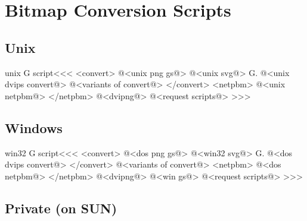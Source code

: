 \documentclass{article}
\begin{document}
\section{Bitmap Conversion Scripts}



\subsection{Unix}




\<unix G script\><<<
 <convert>
@<unix png gs@>
@<unix svg@>
G.
@<unix dvips convert@>
@<variants of convert@>
 </convert>    
<netpbm>
@<unix netpbm@>
</netpbm>
@<dvipng@>
@<request scripts@> %
>>>


\subsection{Windows}



\<win32 G script\><<<
  <convert>
@<dos png gs@>
@<win32 svg@>
G.
@<dos dvips convert@>
  </convert>
@<variants of convert@>
<netpbm>
@<dos netpbm@>
</netpbm>
@<dvipng@>
@<win gs@>
@<request scripts@> %
>>>


\subsection{Private (on SUN)}
\end{document}
